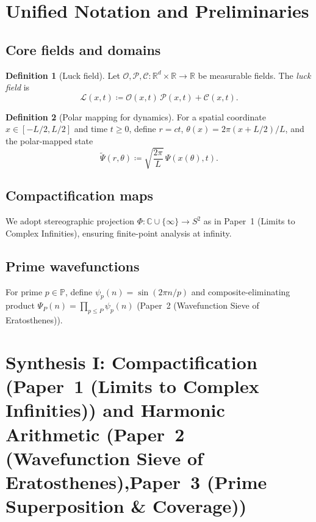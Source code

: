 \documentclass[12pt]{article}
\newcommand{\Luck}{\mathcal{L}}      %
\newcommand{\Opp}{\mathcal{O}}       %
\newcommand{\Prep}{\mathcal{P}}      %
\newcommand{\Circ}{\mathcal{C}}      %
\newcommand{\Psit}{\tilde{\Psi}}     %
\newcommand{\Sphere}{S^2}
\newcommand{\Primes}{\mathbb{P}}
\newcommand{\Stereo}{\Phi}
\newcommand{\PaperI}{Paper~1 (Limits to Complex Infinities)}
\newcommand{\PaperII}{Paper~2 (Wavefunction Sieve of Eratosthenes)}
\newcommand{\PaperIII}{Paper~3 (Prime Superposition \& Coverage)}
\newcommand{\PaperV}{Paper~5 (Polar Ripple Framework)}
\theoremstyle{plain}
\theoremstyle{definition}
\newtheorem{definition}{Definition}
\theoremstyle{remark}
\begin{document}
\section{Unified Notation and Preliminaries}
\subsection{Core fields and domains}
\begin{definition}[Luck field]
Let \(\Opp,\Prep,\Circ:\mathbb{R}^{d}\times\mathbb{R}\to\mathbb{R}\) be measurable fields. The \emph{luck field} is
\[
\Luck(x,t) \coloneqq \Opp(x,t)\,\Prep(x,t) + \Circ(x,t).
\]
\end{definition}

\begin{definition}[Polar mapping for dynamics]
For a spatial coordinate \(x\in[-L/2,L/2]\) and time \(t\ge0\), define \(r=ct\), \(\theta(x)=2\pi(x+L/2)/L\), and the polar-mapped state
\[
\Psit(r,\theta) \coloneqq \sqrt{\frac{2\pi}{L}}\,\Psi(x(\theta),t).
\]
\end{definition}

\subsection{Compactification maps}
We adopt stereographic projection \(\Stereo:\mathbb{C}\cup\{\infty\}\to \Sphere\) as in \PaperI, ensuring finite-point analysis at infinity.

\subsection{Prime wavefunctions}
For prime \(p\in\Primes\), define \(\psi_p(n)=\sin(2\pi n/p)\) and composite-eliminating product \(\Psi_P(n)=\prod_{p\le P}\psi_p(n)\) (\PaperII).

\section{Synthesis I: Compactification \texorpdfstring{(\PaperI)}{} and Harmonic Arithmetic \texorpdfstring{(\PaperII,\PaperIII)}{}}
\end{document}
